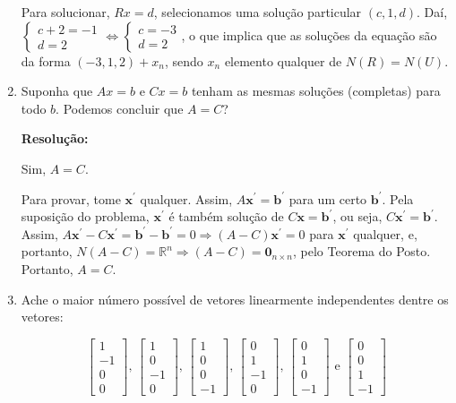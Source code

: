 \documentclass[leqno]{article}
\begin{document}
\begin{enumerate}
    Para solucionar, $Rx=d$, selecionamos uma solução particular $(c,1,d)$. Daí, $\begin{cases}c+2=-1\\d=2\end{cases}\iff\begin{cases}c=-3\\d=2\end{cases}$, o que implica que as soluções da equação são da forma $(-3,1,2)+x_n$, sendo $x_n$ elemento qualquer de $N(R)=N(U)$.
    
    \item Suponha que $Ax=b$ e $Cx=b$ tenham as mesmas soluções (completas) para todo $b$. Podemos concluir que $A=C$?
    
    \textbf{Resolução:}
    
    Sim, $A=C$.
    
    Para provar, tome $\textbf{x}^\prime$ qualquer. Assim, $A\textbf{x}^\prime=\textbf{b}^\prime$ para um certo $\textbf{b}^\prime$. Pela suposição do problema, $\textbf{x}^\prime$ é também solução de $C\textbf{x}=\textbf{b}^\prime$, ou seja, $C\textbf{x}^\prime=\textbf{b}^\prime$. Assim, $A\textbf{x}^\prime-C\textbf{x}^\prime=\textbf{b}^\prime-\textbf{b}^\prime=0\Rightarrow(A-C)\textbf{x}^\prime=0$ para $\textbf{x}^\prime$ qualquer, e, portanto, $N(A-C)=\mathbb{R}^n\Rightarrow(A-C)=\textbf{0}_{n\times n}$, pelo Teorema do Posto. Portanto, $A=C$.
    
    \item Ache o maior número possível de vetores linearmente independentes dentre os vetores:
    
    $$\begin{bmatrix}
    1\\-1\\0\\0
    \end{bmatrix}\text{, }\begin{bmatrix}
    1\\0\\-1\\0
    \end{bmatrix}\text{, }\begin{bmatrix}
    1\\0\\0\\-1
    \end{bmatrix}\text{, }\begin{bmatrix}
    0\\1\\-1\\0
    \end{bmatrix}\text{, }\begin{bmatrix}
    0\\1\\0\\-1
    \end{bmatrix}\text{ e }\begin{bmatrix}
    0\\0\\1\\-1
    \end{bmatrix}$$
    

\end{enumerate}
\end{document}
